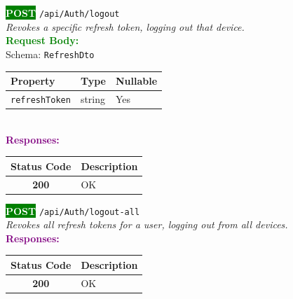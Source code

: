 \begin{tcolorbox}[
    colback=green!5,
    colframe=green,
    arc=2mm,
    boxrule=1pt,
    left=5pt,
    right=5pt,
    top=5pt,
    bottom=5pt
]
\noindent\colorbox{green}{\textcolor{white}{\textbf{POST}}} 
\texttt{\large /api/Auth/logout}\\[0.3em]
\textit{Revokes a specific refresh token, logging out that device.}\\[0.3em]
\vspace{0.3em}
\textbf{\textcolor{green}{Request Body:}}\\[0.2em]
Schema: \texttt{RefreshDto}\\[0.3em]
\begin{tabular}{|l|l|l|}
\hline
\rowcolor{green!10}
\textbf{Property} & \textbf{Type} & \textbf{Nullable} \\ \hline
\texttt{refreshToken} & string & Yes \\ \hline
\end{tabular}\\[0.5em]
\vspace{0.3em}
\textbf{\textcolor{purple}{Responses:}}\\[0.2em]
\begin{tabular}{|c|p{10cm}|}
\hline
\rowcolor{gray!20}
\textbf{Status Code} & \textbf{Description} \\ \hline
\colorbox{green!20}{\textbf{200}} & OK \\ \hline
\end{tabular}
\end{tcolorbox}
\vspace{0.5em}

\begin{tcolorbox}[
    colback=green!5,
    colframe=green,
    arc=2mm,
    boxrule=1pt,
    left=5pt,
    right=5pt,
    top=5pt,
    bottom=5pt
]
\noindent\colorbox{green}{\textcolor{white}{\textbf{POST}}} 
\texttt{\large /api/Auth/logout-all}\\[0.3em]
\textit{Revokes all refresh tokens for a user, logging out from all devices.}\\[0.3em]
\vspace{0.3em}
\textbf{\textcolor{purple}{Responses:}}\\[0.2em]
\begin{tabular}{|c|p{10cm}|}
\hline
\rowcolor{gray!20}
\textbf{Status Code} & \textbf{Description} \\ \hline
\colorbox{green!20}{\textbf{200}} & OK \\ \hline
\end{tabular}
\end{tcolorbox}
\vspace{0.5em}


